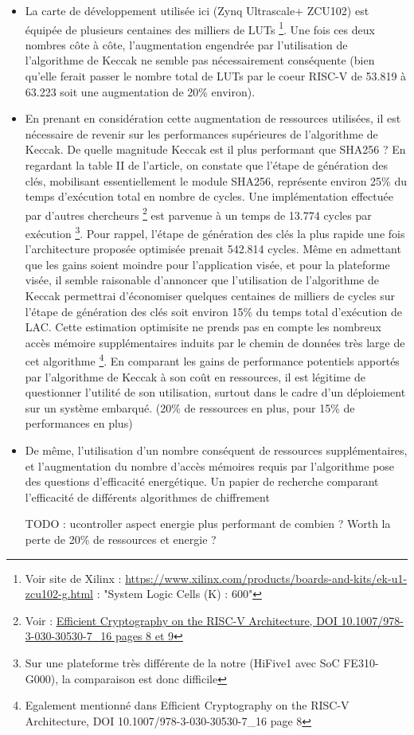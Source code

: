 \documentclass[10pt,a4paper]{article}
\begin{document}
\begin{itemize}
    \item La carte de développement utilisée ici (Zynq Ultrascale+ ZCU102) est équipée de plusieurs centaines des milliers de LUTs \footnote{Voir site de Xilinx : 
    \url{https://www.xilinx.com/products/boards-and-kits/ek-u1-zcu102-g.html} : "System Logic Cells (K) : 600"}. 
Une fois ces deux nombres côte à côte, l'augmentation engendrée par l'utilisation de l'algorithme de Keccak ne semble pas nécessairement conséquente (bien qu'elle 
ferait passer le nombre total de LUTs par le coeur RISC-V de 53.819 à 63.223 soit une augmentation de 20\% environ).
    \item En prenant en considération cette augmentation de ressources utilisées, il est nécessaire de revenir sur les performances supérieures de  
 l'algorithme de Keccak. De quelle magnitude Keccak est il plus performant que SHA256 ? En regardant la table II de l'article, on constate que l'étape de génération 
 des clés, mobilisant essentiellement le module SHA256, représente environ 25\% du temps d'exécution total en nombre de cycles. Une implémentation effectuée par d'autres 
 chercheurs \footnote{Voir : \href{https://eprint.iacr.org/2019/794.pdf}{Efficient Cryptography on the RISC-V Architecture, DOI 10.1007/978-3-030-30530-7\_16 pages 8 et 9}} est parvenue 
 à un temps de 13.774 cycles par exécution \footnote{Sur une plateforme très différente de la notre (HiFive1 avec SoC FE310-G000), la comparaison est donc difficile}. 
 Pour rappel, l'étape de génération des clés la plus rapide une fois l'architecture proposée optimisée prenait 542.814 cycles. Même en admettant que les gains soient moindre 
 pour l'application visée, et pour la plateforme visée, il semble raisonable d'annoncer que l'utilisation de l'algorithme de Keccak permettrai d'économiser quelques centaines 
 de milliers de cycles sur l'étape de génération des clés soit environ 15\% du temps total d'exécution de LAC. Cette estimation optimisite ne prends pas en compte les nombreux accès 
 mémoire supplémentaires induits par le chemin de données très large de cet algorithme \footnote{Egalement mentionné dans Efficient Cryptography on the RISC-V Architecture, DOI 10.1007/978-3-030-30530-7\_16 page 8}. 
 En comparant les gains de performance potentiels apportés par l'algorithme de Keccak à son coût en ressources, il est légitime de questionner l'utilité de son utilisation, surtout dans le cadre 
 d'un déploiement sur un système embarqué. (20\% de ressources en plus, pour 15\% de performances en plus)
    \item De même, l'utilisation d'un nombre conséquent de ressources supplémentaires, et l'augmentation du nombre d'accès mémoires requis par l'algorithme pose des questions d'efficacité 
 energétique. Un papier de recherche comparant l'efficacité de différents algorithmes de chiffrement

TODO : ucontroller
       aspect energie
       plus performant de combien ? Worth la perte de 20\% de ressources et energie ?
\end{itemize}
\end{document}
